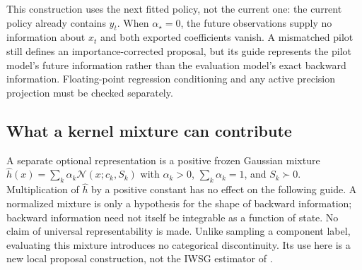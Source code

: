 This construction uses the next fitted policy, not the current one: the
current policy already contains $y_t$. When $\alpha_\star=0$, the future
observations supply no information about $x_t$ and both exported coefficients
vanish. A mismatched pilot still defines an importance-corrected proposal,
but its guide represents the pilot model's future information rather than
the evaluation model's exact backward information. Floating-point regression
conditioning and any active precision projection must be checked separately.

\subsection{What a kernel mixture can contribute}

A separate optional representation is a positive frozen Gaussian mixture
$\widehat h(x)=\sum_k\alpha_k\mathcal N(x;c_k,S_k)$ with
$\alpha_k>0$, $\sum_k\alpha_k=1$, and $S_k\succ0$. Multiplication of
$\widehat h$ by a positive constant has no effect on the following guide.
A normalized mixture is only a hypothesis for the shape of backward
information; backward information need not itself be integrable as a
function of state. No claim of universal representability is made.
Unlike sampling a component label, evaluating this mixture introduces no
categorical discontinuity. Its use here is a new local proposal construction,
not the IWSG estimator of \citet{younis2023}.

